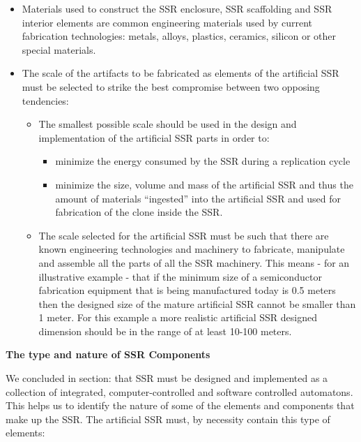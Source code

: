 \bigskip

\begin{itemize}
\item Materials used to construct the SSR enclosure, SSR scaffolding and
SSR interior elements are common engineering materials used by current
fabrication technologies: metals, alloys, plastics, ceramics, silicon
or other special materials.
\item The scale of the artifacts to be fabricated as elements of the
artificial SSR must be selected to strike the best compromise between
two opposing tendencies:

\begin{itemize}
\item The smallest possible scale should be used in the design and
implementation of the artificial SSR parts in order to:

\begin{itemize}
\item minimize the energy consumed by the SSR during a replication cycle

\item minimize the size, volume and mass of the artificial SSR and thus
the amount of materials “ingested” into the artificial SSR and used for
fabrication of the clone inside the SSR.
\end{itemize}
\item The scale selected for the artificial SSR must be such that there
are known engineering technologies and machinery to fabricate,
manipulate and assemble all the parts of all the SSR machinery. This
means - for an illustrative example - that if the minimum size of a
semiconductor fabrication equipment that is being manufactured today is
0.5 meters then the designed size of the mature artificial SSR cannot
be smaller than 1 meter. For this example a more realistic artificial
SSR designed dimension should be in the range of at least 10-100
meters.
\end{itemize}
\end{itemize}

\bigskip


\bigskip


\bigskip

{\bfseries
\hypertarget{RefHeading3126306210128}{}The type and nature of SSR
Components}


\bigskip

We concluded in section:   that SSR must be designed and implemented as
a collection of integrated, computer-controlled and software controlled
automatons. This helps us to identify the nature of some of the
elements and components that make up the SSR. The artificial SSR must,
by necessity contain this type of elements:


